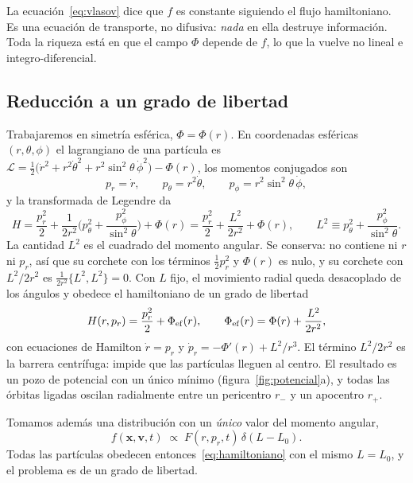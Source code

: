\documentclass[11pt,a4paper]{article}
\newcommand{\rp}{p_r}
\theoremstyle{definition}
\begin{document}
La ecuación~\eqref{eq:vlasov} dice que $f$ es constante siguiendo el flujo
hamiltoniano. Es una ecuación de transporte, no difusiva: \emph{nada} en ella
destruye información. Toda la riqueza está en que el campo $\Phi$ depende de $f$,
lo que la vuelve no lineal e integro-diferencial.

\subsection{Reducción a un grado de libertad}

Trabajaremos en simetría esférica, $\Phi=\Phi(r)$. En coordenadas esféricas
$(r,\theta,\phi)$ el lagrangiano de una partícula es
$\mathcal{L}=\tfrac12\big(\dot r^2+r^2\dot\theta^2+r^2\sin^2\theta\,\dot\phi^2\big)
-\Phi(r)$, los momentos conjugados son
\begin{equation}
  p_r=\dot r, \qquad p_\theta=r^2\dot\theta, \qquad p_\phi=r^2\sin^2\theta\,\dot\phi,
\end{equation}
y la transformada de Legendre da
\begin{equation}
  H = \frac{p_r^2}{2}
    + \frac{1}{2r^2}\Big(p_\theta^2+\frac{p_\phi^2}{\sin^2\theta}\Big)
    + \Phi(r)
  = \frac{p_r^2}{2} + \frac{L^2}{2r^2} + \Phi(r) ,
  \qquad
  L^2 \equiv p_\theta^2+\frac{p_\phi^2}{\sin^2\theta} .
  \label{eq:hesferico}
\end{equation}
La cantidad $L^2$ es el cuadrado del momento angular. Se conserva: no contiene ni $r$
ni $p_r$, así que su corchete con los términos $\tfrac12p_r^2$ y $\Phi(r)$ es nulo, y
su corchete con $L^2/2r^2$ es $\tfrac{1}{2r^2}\{L^2,L^2\}=0$. Con $L$ fijo, el
movimiento radial queda desacoplado de los ángulos y obedece el hamiltoniano de un
grado de libertad
\begin{equation}
  H(r,\rp) = \frac{\rp^2}{2} + \Phi_{\rm ef}(r),
  \qquad
  \Phi_{\rm ef}(r) = \Phi(r) + \frac{L^2}{2r^2},
  \label{eq:hamiltoniano}
\end{equation}
con ecuaciones de Hamilton $\dot r=\rp$ y $\dot p_r=-\Phi'(r)+L^2/r^3$. El término
$L^2/2r^2$ es la barrera centrífuga: impide que las partículas lleguen al centro. El
resultado es un pozo de potencial con un único mínimo (figura~\ref{fig:potencial}a), y
todas las órbitas ligadas oscilan radialmente entre un pericentro $r_-$ y un
apocentro $r_+$.

Tomamos además una distribución con un \emph{único} valor del momento angular,
\begin{equation}
  f(\mathbf{x},\mathbf{v},t) \;\propto\; F(r,\rp,t)\,\delta(L-L_0).
  \label{eq:deltaL}
\end{equation}
Todas las partículas obedecen entonces~\eqref{eq:hamiltoniano} con el mismo
$L=L_0$, y el problema es de un grado de libertad.
\end{document}
